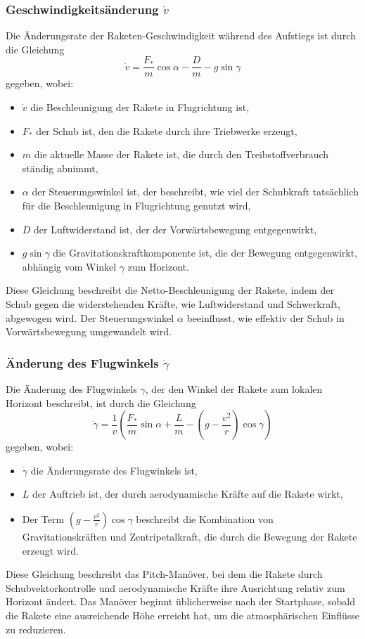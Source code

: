 \subsubsection{Geschwindigkeitsänderung \(\dot{v}\)}
Die Änderungsrate der Raketen-Geschwindigkeit während des Aufstiegs ist durch die Gleichung
\[
\dot{v} = \frac{F_*}{m} \cos \alpha - \frac{D}{m} - g \sin \gamma
\]
gegeben, wobei:
\begin{itemize}
	\item \(\dot{v}\) die Beschleunigung der Rakete in Flugrichtung ist,
	\item \(F_*\) der Schub ist, den die Rakete durch ihre Triebwerke erzeugt,
	\item \(m\) die aktuelle Masse der Rakete ist, die durch den Treibstoffverbrauch ständig abnimmt,
	\item \(\alpha\) der Steuerungswinkel ist, der beschreibt, wie viel der Schubkraft tatsächlich für die Beschleunigung in Flugrichtung genutzt wird,
	\item \(D\) der Luftwiderstand ist, der der Vorwärtsbewegung entgegenwirkt,
	\item \(g \sin \gamma\) die Gravitationskraftkomponente ist, die der Bewegung entgegenwirkt, abhängig vom Winkel \(\gamma\) zum Horizont.
\end{itemize}
Diese Gleichung beschreibt die Netto-Beschleunigung der Rakete, indem der Schub gegen die widerstehenden Kräfte, wie Luftwiderstand und Schwerkraft, abgewogen wird. 
Der Steuerungswinkel \(\alpha\) beeinflusst, wie effektiv der Schub in Vorwärtsbewegung umgewandelt wird.

\subsubsection{Änderung des Flugwinkels \(\dot{\gamma}\)}
Die Änderung des Flugwinkels \(\gamma\), der den Winkel der Rakete zum lokalen Horizont beschreibt, ist durch die Gleichung
\[
\dot{\gamma} = \frac{1}{v}\left( \frac{F_*}{m} \sin \alpha + \frac{L}{m} - \left(g - \frac{v^2}{r}\right) \cos \gamma \right)
\]
gegeben, wobei:
\begin{itemize}
	\item \(\dot{\gamma}\) die Änderungsrate des Flugwinkels ist,
	\item \(L\) der Auftrieb ist, der durch aerodynamische Kräfte auf die Rakete wirkt,
	\item Der Term \(\left(g - \frac{v^2}{r}\right) \cos \gamma\) beschreibt die Kombination von Gravitationskräften und Zentripetalkraft, die durch die Bewegung der Rakete erzeugt wird.
\end{itemize}
Diese Gleichung beschreibt das Pitch-Manöver, bei dem die Rakete durch Schubvektorkontrolle und aerodynamische Kräfte ihre Ausrichtung relativ zum Horizont ändert. Das Manöver beginnt üblicherweise nach der Startphase, sobald die Rakete eine ausreichende Höhe erreicht hat, um die atmosphärischen Einflüsse zu reduzieren.

